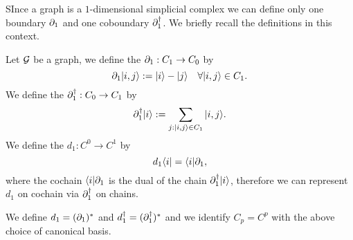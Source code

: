 \documentclass[../2.tex]{subfiles}
\begin{document}
    
    SInce a graph is a $1$-dimensional simplicial complex we can define only one boundary $\partial_1$ and one coboundary $\partial_1^\dagger$.
    We briefly recall the definitions in this context.

    \begin{defn}
        Let $\mathcal{G}$ be a graph, we define the  $\partial_1 : C_1 \to C_0$ by 
        \[ \partial_1| i,j \rangle := | i \rangle - | j \rangle \quad \forall | i,j \rangle \in C_1.\]
        We define the  $\partial^\dagger_1 : C_0 \to C_1$ by 
        \[ \partial^\dagger_1| i \rangle := \sum_{j : | i,j \rangle \in C_1} | i,j \rangle.\]
        We define the  $d_1 : C^0 \to C^1$ by
        \[ d_1\langle i | = \langle i |\partial_1,\]
        where the cochain $\langle i |\partial_1$ is the dual of the chain $\partial_1^\dagger| i \rangle$,
        therefore we can represent $d_1$ on cochain via $\partial_1^\dagger$ on chains.
    \end{defn}

    We define $d_1 = (\partial_1)^*$ and $d_1^\dagger = (\partial_1^\dagger)^*$ and we identify $C_p = C^p$ with the above choice of
    canonical basis.





\end{document}

